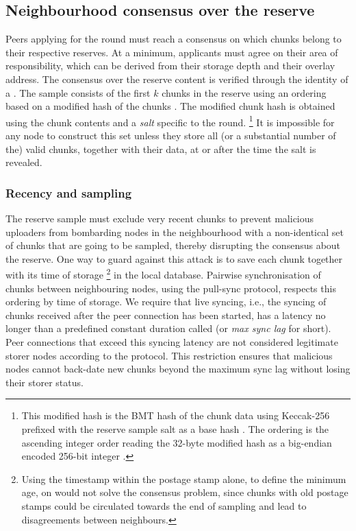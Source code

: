  
\subsection{Neighbourhood consensus over the reserve}\label{sec:por}

Peers applying for the round must reach a consensus on which chunks belong to their respective reserves. At a minimum, applicants must agree on their area of responsibility, which can be derived from their storage depth and their overlay address.  
The consensus over the reserve content is verified through the identity of a .
The sample consists of the first $k$ chunks in the reserve using an ordering based on a modified hash of the chunks%
.  The modified chunk hash is  obtained using the chunk contents and a \emph{salt} specific to the round.%
%
\footnote{This modified hash is the BMT hash of the chunk data using Keccak-256 prefixed with the reserve sample salt as a base hash%
. The ordering is the ascending integer order reading the 32-byte modified hash as a big-endian encoded 256-bit integer%
.}
%
It is impossible for any node to construct this set unless they store all (or a substantial number of the) valid chunks, together with their data, at or after the time the salt is revealed. 

\subsubsection{Recency and sampling}

The reserve sample must exclude very recent chunks to prevent malicious uploaders from bombarding nodes in the neighbourhood with a non-identical set of chunks that are going to be sampled, thereby disrupting the consensus about the reserve. One way to guard against this attack is to save each chunk together with its time of storage%
%
\footnote{Using the timestamp within the postage stamp alone, to define the minimum age, on would not solve the consensus problem, since chunks with old postage stamps could be circulated towards the end of sampling and lead to disagreements between neighbours.}
% 
in the local database.
Pairwise synchronisation of chunks between neighbouring nodes, using the pull-sync protocol, respects this ordering by time of storage. 
We require that live syncing, i.e., the syncing of chunks received after the peer connection has been started, has a latency no longer than a predefined constant duration called  (or \emph{max sync lag} for short). Peer connections that exceed this syncing latency are not considered legitimate storer nodes according to the protocol. This restriction ensures that malicious nodes cannot back-date new chunks beyond the maximum sync lag without losing their storer status. 

